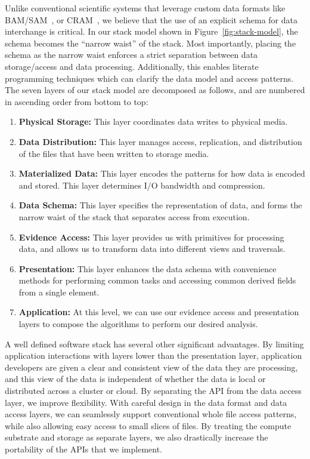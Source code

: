 \documentclass[masters]{ucbthesis}
\begin{document}
Unlike conventional scientific systems that leverage custom data formats like BAM/SAM~\cite{li09},
or CRAM~\cite{fritz11}, we believe that the use of an explicit schema for data interchange is critical.
In our stack model shown in Figure~\ref{fig:stack-model}, the schema becomes the ``narrow waist''
of the stack. Most importantly, placing the schema as the narrow waist enforces a strict separation
between data storage/access and data processing. Additionally, this enables literate programming
techniques which can clarify the data model and access patterns. The seven layers of our stack model
are decomposed as follows, and are numbered in ascending order from bottom to top:

\begin{enumerate}
\item \textbf{Physical Storage:} This layer coordinates data writes to physical media.
\item \textbf{Data Distribution:} This layer manages access, replication, and distribution of the files that have
been written to storage media.
\item \textbf{Materialized Data:} This layer encodes the patterns for how data is encoded and stored. This
layer determines I/O bandwidth and compression.
\item \textbf{Data Schema:} This layer specifies the representation of data, and forms the narrow waist of
the stack that separates access from execution.
\item \textbf{Evidence Access:} This layer provides us with primitives for processing data, and allows us to
transform data into different views and traversals.
\item \textbf{Presentation:} This layer enhances the data schema with convenience methods for performing
common tasks and accessing common derived fields from a single element.
\item \textbf{Application:} At this level, we can use our evidence access and presentation layers to compose
the algorithms to perform our desired analysis.
\end{enumerate}

A well defined software stack has several other significant advantages. By limiting application
interactions with layers lower than the presentation layer, application developers are given a clear and
consistent view of the data they are processing, and this view of the data is independent of whether the
data is local or distributed across a cluster or cloud. By separating the API from the data access layer,
we improve flexibility. With careful design in the data format and data access layers, we can seamlessly
support conventional whole file access patterns, while also allowing easy access to small slices of files.
By treating the compute substrate and storage as separate layers, we also drastically increase
the portability of the APIs that we implement.
\end{document}
